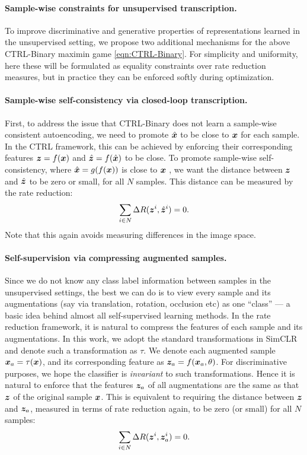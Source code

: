 \documentclass[\toplevelprefix/book-main.tex]{subfiles}
\begin{document}
\paragraph{Sample-wise constraints for unsupervised transcription.} 
\label{sec:constraints}
To improve discriminative and generative properties of representations learned in the unsupervised setting, we propose two additional mechanisms for the above CTRL-Binary maximin game \eqref{eqn:CTRL-Binary}.  For simplicity and uniformity, here these will be formulated as equality constraints over rate reduction measures, but in practice they can be enforced softly during optimization.

\paragraph{Sample-wise self-consistency via closed-loop transcription.} 
First, to address the issue that CTRL-Binary does not learn a sample-wise consistent autoencoding, we need to promote $\hat {\bm{x}}$ to be close to $\bm{x}$ for each sample. In the CTRL framework, this can be achieved by enforcing their corresponding features $\bm{z}=f(\bm{x})$ and $\hat {\bm{z}} = f(\hat {\bm{x}})$ to be close. 
To promote sample-wise self-consistency, where $\hat{\bm{x}} = g(f(\bm{x}))$ is close to $\bm{x}$ , we want the distance between $\bm{z}$ and $\hat{\bm{z}}$ to be zero or small, for all $N$ samples.
This distance can be measured by the rate reduction:
\begin{align}
\sum_{i\in N} \Delta R(\z^i,\hat{\z}^i) = 0.
\label{eqn:sample-self-consistency}\vspace{-2mm}
\end{align}
Note that this again avoids measuring differences in the image space.

\paragraph{Self-supervision via compressing augmented samples.} 
Since we do not know any class label information between samples in the unsupervised settings, the best we can do is to view every sample and its augmentations (say via translation, rotation,  occlusion etc) as one ``class'' --- a basic idea behind almost all self-supervised learning methods. In the rate reduction framework, it is natural to compress the features of each sample and its augmentations. In this work, we adopt the standard transformations in SimCLR \cite{chen2020simple} and denote such a transformation as $\tau$. We denote each augmented sample $\bm{x}_a = \tau(\bm{x})$, and its corresponding feature as $\bm{z}_a = f(\bm{x}_a, \theta) $. For discriminative purposes, we hope the classifier is {\em invariant} to such transformations. Hence it is natural to enforce that the features $\bm{z}_a$ of all augmentations are the same as that $\bm{z}$ of the original sample $\bm{x}$. This is equivalent to requiring the distance between $\bm{z}$  and  $\bm{z}_a$, measured in terms of rate reduction again, to be zero (or small) for all $N$ samples: 
\begin{align}
\sum_{i\in N} \Delta R(\z^i,\z_{a}^i) = 0.
\label{eqn:sample-compression}\vspace{-3mm}
\end{align}
\end{document}
